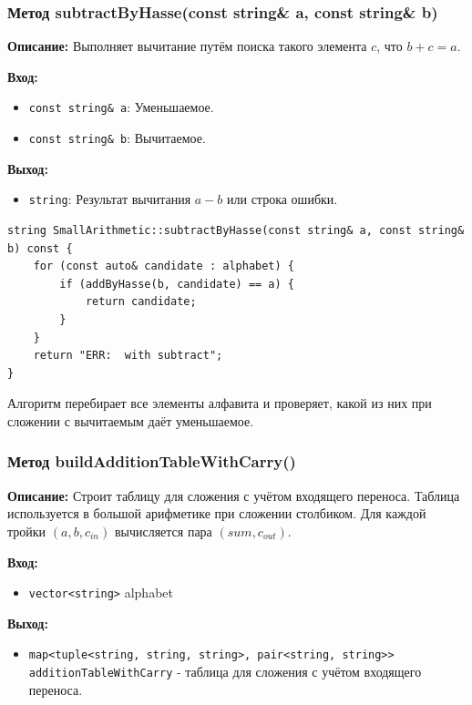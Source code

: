 \subsubsection{Метод subtractByHasse(const string\& a, const string\& b)}

\textbf{Описание:} Выполняет вычитание путём поиска такого элемента $c$, что $b + c = a$.

\textbf{Вход:}
\begin{itemize}
    \item \texttt{const string\& a}: Уменьшаемое. 
    \item \texttt{const string\& b}: Вычитаемое.
\end{itemize}

\textbf{Выход:}
\begin{itemize}
    \item \texttt{string}:  Результат вычитания $a - b$ или строка ошибки.
\end{itemize}

\begin{lstlisting}[style=cstyle, caption={Реализация subtractByHasse()}]
string SmallArithmetic::subtractByHasse(const string& a, const string& b) const {
    for (const auto& candidate : alphabet) {
        if (addByHasse(b, candidate) == a) {
            return candidate;
        }
    }
    return "ERR:  with subtract";
}
\end{lstlisting}

Алгоритм перебирает все элементы алфавита и проверяет, какой из них при сложении с вычитаемым даёт уменьшаемое. 

\newpage


\subsubsection{Метод buildAdditionTableWithCarry()}

\textbf{Описание:} Строит таблицу для сложения с учётом входящего переноса. Таблица используется в большой арифметике при сложении столбиком.  Для каждой тройки $(a, b, c_{in})$ вычисляется пара $(sum, c_{out})$.

\textbf{Вход:}
\begin{itemize}
    \item \texttt{vector<string>} alphabet
\end{itemize}

\textbf{Выход:}
\begin{itemize}
    \item \texttt{map<tuple<string, string, string>, pair<string, string>> additionTableWithCarry} - таблица для сложения с учётом входящего переноса.
\end{itemize}

